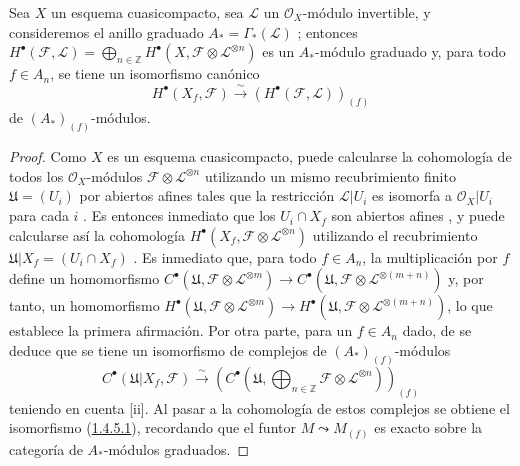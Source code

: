 \begin{proposition}[1.4.5]
\label{III.1.4.5}
\label{III.1.4.5-fr}
Sea $X$ un esquema cuasicompacto, sea $\mathcal L$ un $\mathcal O_X$-módulo invertible, y consideremos el anillo graduado $A_*=\Gamma_*(\mathcal L)$ \textup{}; entonces $H^\bullet(\mathcal F,\mathcal L)
=\bigoplus_{n\in\mathbb Z}H^\bullet(X,\mathcal F\otimes\mathcal L^{\otimes n})$ es un $A_*$-módulo graduado y, para todo $f\in A_n$, se tiene un isomorfismo canónico
\begin{equation}
\label{III.1.4.5.1-fr}
\tag{1.4.5.1}
H^\bullet(X_f,\mathcal F)
\xrightarrow{\sim}(H^\bullet(\mathcal F,\mathcal L))_{(f)}
\end{equation}
de $(A_*)_{(f)}$-módulos.
\end{proposition}

\begin{proof}
Como $X$ es un esquema cuasicompacto, puede calcularse la cohomología de todos los $\mathcal O_X$-módulos $\mathcal F\otimes\mathcal L^{\otimes n}$ utilizando un mismo recubrimiento finito $\mathfrak U=(U_i)$ por abiertos afines tales que la restricción
$\mathcal L\vert U_i$ es isomorfa a $\mathcal O_X\vert U_i$ para cada
$i$ .
Es entonces inmediato que los $U_i\cap X_f$ son abiertos afines , y puede calcularse así la cohomología $H^\bullet(X_f,\mathcal F\otimes\mathcal L^{\otimes n})$ utilizando el recubrimiento $\mathfrak U\vert X_f=(U_i\cap X_f)$ .
Es inmediato que, para todo $f\in A_n$, la multiplicación por $f$ define un homomorfismo $C^\bullet(\mathfrak U,\mathcal F\otimes\mathcal L^{\otimes m})
\longrightarrow
C^\bullet(\mathfrak U,\mathcal F\otimes\mathcal L^{\otimes(m+n)})$ y, por tanto, un homomorfismo $H^\bullet(\mathfrak U,\mathcal F\otimes\mathcal L^{\otimes m})
\longrightarrow
H^\bullet(\mathfrak U,\mathcal F\otimes\mathcal L^{\otimes(m+n)})$, lo que establece la primera afirmación.
Por otra parte, para un $f\in A_n$ dado, de  se deduce que se tiene un isomorfismo de complejos de $(A_*)_{(f)}$-módulos
\[
C^\bullet(\mathfrak U\vert X_f,\mathcal F)
\xrightarrow{\sim}
\left(C^\bullet\left(\mathfrak U,
\bigoplus_{n\in\mathbb Z}\mathcal F\otimes\mathcal L^{\otimes n}
\right)\right)_{(f)}
\]
teniendo en cuenta [ii].
Al pasar a la cohomología de estos complejos se obtiene el isomorfismo (\hyperref[III.1.4.5.1]{1.4.5.1}), recordando que el funtor $M\leadsto M_{(f)}$ es exacto sobre la categoría de $A_*$-módulos graduados.
\end{proof}

